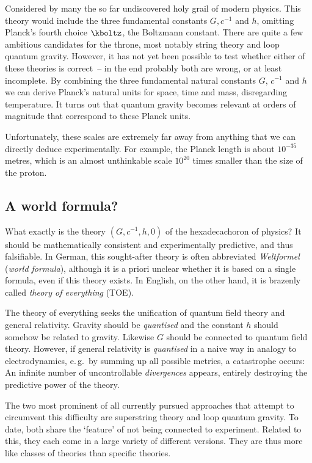 
\newpage {}
\label{sec:1110}

Considered by many the so far undiscovered holy grail of modern physics. This theory would include the three fundamental constants $G,c^{−1}$ and $h$, omitting Planck's fourth choice $\kboltz$, the Boltzmann constant. There are quite a few ambitious candidates for the throne, most notably string theory and loop quantum gravity. However, it has not yet been possible to test whether either of these theories is correct~-- in the end probably both are wrong, or at least incomplete. By combining the three fundamental natural constants $G$, $c^{-1}$ and $h$ we can derive Planck's natural units for space, time and mass, disregarding temperature. It turns out that quantum gravity becomes relevant at orders of magnitude that correspond to these Planck units.

Unfortunately, these scales are extremely far away from anything that we can directly deduce experimentally. For example, the Planck length is about $10^{−35}$ metres, which is an almost unthinkable scale $10^{20}$ times smaller than the size of the proton.


\subsection*{A world formula?}

What exactly is the theory $(G,c^{-1},h,0)$ of the hexadecachoron of physics? It should be mathematically consistent and experimentally predictive, and thus falsifiable. In German, this sought-after theory is often abbreviated \emph{Weltformel} (\emph{world formula}), although it is a priori unclear whether it is based on a single formula, even if this theory exists. In English, on the other hand, it is brazenly called \emph{theory of everything} (TOE).

The theory of everything seeks the unification of quantum field theory and general relativity. Gravity should be \emph{quantised} and the constant $h$ should somehow be related to gravity. Likewise $G$ should be connected to quantum field theory. However, if general relativity is \emph{quantised} in a naive way in analogy to electrodynamics, e.\,g.\ by summing up all possible metrics, a catastrophe occurs: An infinite number of uncontrollable \emph{divergences} appears, entirely destroying the predictive power of the theory.

The two most prominent of all currently pursued approaches that attempt to circumvent this difficulty are superstring theory and loop quantum gravity. To date, both share the \enquote*{feature} of not being connected to experiment. Related to this, they each come in a large variety of different versions. They are thus more like classes of theories than specific theories.


